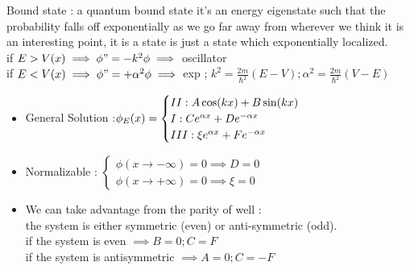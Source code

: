 \documentclass[12pt,oneside]{book}
\begin{document}
	Bound state : a quantum bound state it's an energy eigenstate such that the probability falls off exponentially as we go far away from wherever we think it is an interesting point, it is a state is just a state which  exponentially localized.\\
	if $E > V(x) \implies \phi" = -k^2\phi \implies $ oscillator\\
	if $E < V(x) \implies \phi" =  + \alpha^2\phi \implies$ exp ; $k^2 = \frac{2m}{\hbar^2}(E-V);\alpha^2 = \frac{2m}{\hbar^2}(V-E)$\\
	\begin{itemize}
		\item General Solution :$\phi_E(x) = \begin{cases}
			\rom{2} : A\cos(kx) + B\sin(kx) \\
			\rom{1} : Ce^{\alpha x} + D e^{-\alpha x}\\
			\rom{3}:  \xi 	e^{\alpha x} + F e^{-\alpha x}
		\end{cases}$
		\item Normalizable : 
		$\begin{cases}
			\phi(x\to -\infty) = 0 \implies D = 0\\
			\phi(x\to + \infty) = 0 \implies \xi = 0
		\end{cases}$
		\item We can take advantage from the parity of well : \\
		the system is either symmetric (even) or anti-symmetric (odd).\\
		if the system is even $\implies B = 0 ; C =F$ \\
		if the system is antisymmetric $\implies A = 0 ; C = -F $\\
	

\end{itemize}
\end{document}
